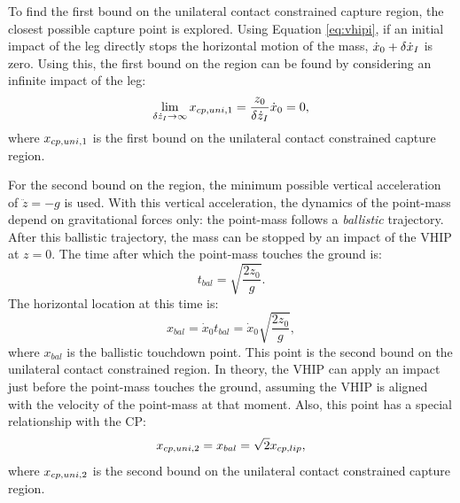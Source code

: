 To find the first bound on the unilateral contact constrained capture region, the closest possible capture point is explored. Using Equation \eqref{eq:vhipi}, if an initial impact of the leg directly stops the horizontal motion of the mass, $\dot{x}_0+\delta \dot{x}_I$ is zero. Using this, the first bound on the region can be found by considering an infinite impact of the leg:
\begin{equation}
	\lim_{\delta \dot{z}_I \to \infty} x_{cp,uni,1} = \frac{z_0}{\delta \dot{z}_I}\dot{x}_0 = 0,
\end{equation}
where $x_{cp,uni,1}$ is the first bound on the unilateral contact constrained capture region.

For the second bound on the region, the minimum possible vertical acceleration of  $\ddot{z} = -g$ is used. With this vertical acceleration, the dynamics of the point-mass depend on gravitational forces only: the point-mass follows a \textit{ballistic} trajectory. After this ballistic trajectory, the mass can be stopped by an impact of the \ac{VHIP} at $z=0$. The time after which the point-mass touches the ground is:
\begin{equation}\label{eq:tbal}
	t_{bal} = \sqrt{\frac{2z_0}{g}}.
\end{equation}
The horizontal location at this time is:
\begin{equation}
	x_{bal}= \dot{x}_0t_{bal}=\dot{x}_0\sqrt{\frac{2z_0}{g}},
	\label{eq:xbal}
\end{equation}
where $x_{bal}$ is the ballistic touchdown point. This point is the second bound on the unilateral contact constrained region. In theory, the \ac{VHIP} can apply an impact just before the point-mass touches the ground, assuming the \ac{VHIP} is aligned with the velocity of the point-mass at that moment. Also, this point has a special relationship with the \ac{CP}:
\begin{equation}
    x_{cp,uni,2} = x_{bal}=\sqrt{2}x_{cp,lip},
\end{equation}
where $x_{cp,uni,2}$ is the second bound on the unilateral contact constrained capture region.


